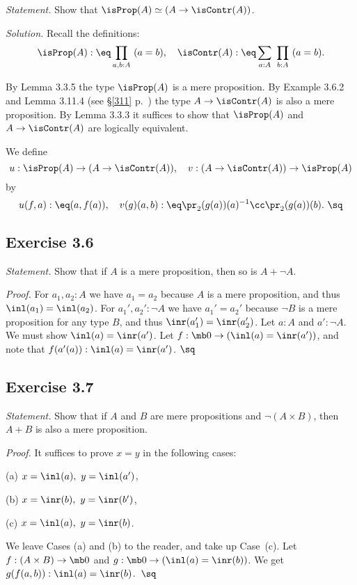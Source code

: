 \documentclass[12pt]{article}
\begin{document}
\emph{Statement.} Show that $\isProp(A)\simeq(A\to\isContr(A))$. 

\nn\emph{Solution.} Recall the definitions: 
$$
\isProp(A):\eq\prod_{a,b:A}\ (a=b),\quad\isContr(A):\eq\sum_{a:A}\ \prod_{b:A}\ (a=b).
$$

By Lemma 3.3.5 the type $\isProp(A)$ is a mere proposition. By Example 3.6.2 and Lemma 3.11.4 (see \S\ref{311} p.~\pageref{311}) the type $A\to\isContr(A)$ is also a mere proposition. By Lemma 3.3.3 it suffices to show that $\isProp(A)$ and $A\to\isContr(A)$ are logically equivalent. 

We define 
$$
u:\isProp(A)\to(A\to\isContr(A)),\quad v:(A\to\isContr(A))\to\isProp(A)
$$ 
by 
$$
u(f,a):\eq(a,f(a)),\quad v(g)(a,b):\eq\pr_2(g(a))(a)^{-1}\cc\pr_2(g(a))(b).\ \sq
$$


\subsection{Exercise 3.6}\label{e36}

\emph{Statement.} Show that if $A$ is a mere proposition, then so is $A+\neg A$.

\nn\emph{Proof.} For $a_1,a_2:A$ we have $a_1=a_2$ because $A$ is a mere proposition, and thus $\inl(a_1)=\inl(a_2)$. For $a_1',a_2':\neg A$ we have $a_1'=a_2'$ because $\neg B$ is a mere proposition for any type $B$, and thus $\inr(a_1')=\inr(a_2')$. Let $a:A$ and $a':\neg A$. We must show $\inl(a)=\inr(a')$. Let $f:\mb0\to(\inl(a)=\inr(a'))$, and note that $f(a'(a)):\inl(a)=\inr(a')$. $\sq$


\subsection{Exercise 3.7}

\emph{Statement.} Show that if $A$ and $B$ are mere propositions and $\neg(A\times B)$, then $A+B$ is also a mere proposition.

\emph{Proof.} %
It suffices to prove $x=y$ in the following cases:

(a) $x=\inl(a),\ y=\inl(a')$,

(b) $x=\inr(b),\ y=\inr(b')$,

(c) $x=\inl(a),\ y=\inr(b)$.

\nn We leave Cases (a) and (b) to the reader, and take up Case~(c). Let $f:(A\times B)\to\mb0$ and $g:\mb0\to(\inl(a)=\inr(b))$. We get $g(f(a,b)):\inl(a)=\inr(b)$.\ $\sq$
\end{document}
